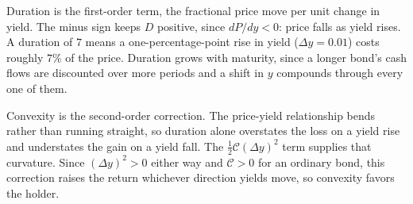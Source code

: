 \bigskip

Duration is the first-order term, the fractional price move per unit change in yield. The minus sign keeps $D$ positive, since $dP/dy < 0$: price falls as yield rises. A duration of $7$ means a one-percentage-point rise in yield ($\Delta y = 0.01$) costs roughly $7\%$ of the price. Duration grows with maturity, since a longer bond's cash flows are discounted over more periods and a shift in $y$ compounds through every one of them.

Convexity is the second-order correction. The price-yield relationship bends rather than running straight, so duration alone overstates the loss on a yield rise and understates the gain on a yield fall. The $\tfrac{1}{2}\mathcal{C}(\Delta y)^2$ term supplies that curvature. Since $(\Delta y)^2 > 0$ either way and $\mathcal{C} > 0$ for an ordinary bond, this correction raises the return whichever direction yields move, so convexity favors the holder.
